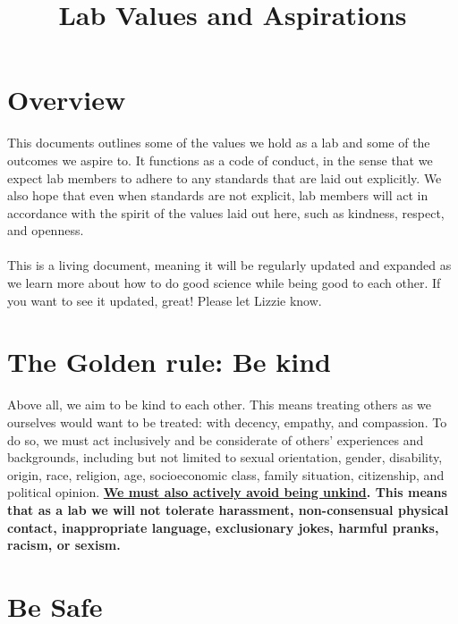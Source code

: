 \documentclass[11pt,a4paper,oneside]{article}
\begin{document}
\title{Lab Values and Aspirations}
\date{}

\maketitle


\section*{Overview}

This documents outlines some of the values we hold as a lab and some of the outcomes we aspire to. It functions as a code of conduct, in the sense that we expect lab members to adhere to any standards that are laid out explicitly. We also hope that even when standards are not explicit, lab members will act in accordance with the spirit of the values laid out here, such as kindness, respect, and openness.\\
\\
\noindent
This is a living document, meaning it will be regularly updated and expanded as we learn more about how to do good science while being good to each other. If you want to see it updated, great! Please let Lizzie know.

\section{The Golden rule: Be kind}

Above all, we aim to be kind to each other. This means treating others as we ourselves would want to be treated: with decency, empathy, and compassion. To do so, we must act inclusively and be considerate of others’ experiences and backgrounds, including but not limited to sexual orientation, gender, disability, origin, race, religion, age, socioeconomic class, family situation, citizenship, and political opinion. \textbf{\underline{We must also actively avoid being unkind}. This means that as a lab we will not tolerate harassment, non-consensual physical contact, inappropriate language, exclusionary jokes, harmful pranks, racism, or sexism.}

\section{Be Safe}
\end{document}
